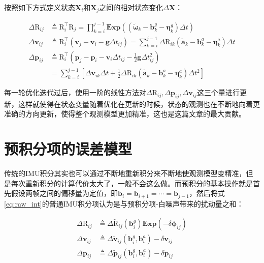 按照如下方式定义状态$\mathbf{X}_i$和$\mathbf{X}_j$之间的相对状态变化$\Delta\mathbf X$：

\begin{equation}
\begin{aligned}
    \Delta\mathrm{R}_{ij}
  &\triangleq \mathrm{R}_i^\top \mathrm{R}_j
  = \prod_{k=i}^{j-1}
  \bm{Exp}\left(
      (\tilde{\bm \omega}_k - \mathbf{b}_k^g - \bm{\eta}_k^g) \Delta t
  \right) \\
  \Delta\mathbf{v}_{ij}
  &\triangleq \mathrm{R}_i^\top (\mathbf{v}_j - \mathbf{v}_i - \mathbf{g} \Delta t_{ij})
  = \sum_{k=i}^{j-1}
  \Delta\mathrm{R}_{ik}
  (\tilde{\mathbf a}_k - \mathbf{b}_k^a - \bm\eta_k^a) \Delta t \\
  \Delta\mathbf{p}_{ij}
  &\triangleq \mathrm{R}_i^\top
  \left(
      \mathbf{p}_j - \mathbf{p}_i -
      \mathbf{v}_i \Delta t_{ij} -
      \frac{1}{2} \mathbf{g} \Delta t_{ij}^2
  \right) \\
  &=           \sum_{k=i}^{j-1}
  \left[
      \Delta\mathbf{v}_{ik} \Delta t +
      \frac{1}{2} \Delta\mathrm{R}_{ik}
      (\tilde{\mathbf a}_k - \mathbf{b}_k^a - \bm\eta_k^a) \Delta t^2
  \right]
\end{aligned}\label{eq:raw_int}
\end{equation}

每一轮优化迭代过后，使用一阶的线性方法对$\Delta\mathrm{R}_{ij}, \Delta\mathbf{p}_{ij}, \Delta\mathbf{v}_{ij}$这三个量进行更新，这样就使得在状态变量随着优化在更新的时候，状态的观测也在不断地向着更准确的方向更新，使得整个观测模型更加精准，这也是这篇文章的最大贡献。

\section{预积分项的误差模型}

传统的IMU积分其实也可以通过不断地重新积分来不断地使观测模型变精准，但是每次重新积分的计算代价太大了，一般不会这么做。而预积分的基本操作就是首先假设两帧之间的偏移量为定值，即$\mathbf{b}_i = \mathbf{b}_{i+1} = \cdots = \mathbf{b}_{j-1}$，然后将式\eqref{eq:raw_int}的普通IMU积分项认为是与预积分项-白噪声带来的扰动量之和：

\begin{equation}
\begin{aligned}
    \Delta\mathrm{R}_{ij} &\triangleq
        \Delta\tilde{\mathrm R}_{ij}(\mathbf{b}^g_i) \bm{Exp}(-\delta\bm\phi_{ij}) \\
    \Delta\mathbf{v}_{ij} &\triangleq
        \Delta\tilde{\mathbf v}_{ij}(\mathbf{b}^g_i, \mathbf{b}^a_i) - \delta\mathbf{v}_{ij} \\
    \Delta\mathbf{p}_{ij} &\triangleq
        \Delta\tilde{\mathbf p}_{ij}(\mathbf{b}^g_i, \mathbf{b}^a_i) - \delta\mathbf{p}_{ij}
\end{aligned}
\end{equation}

